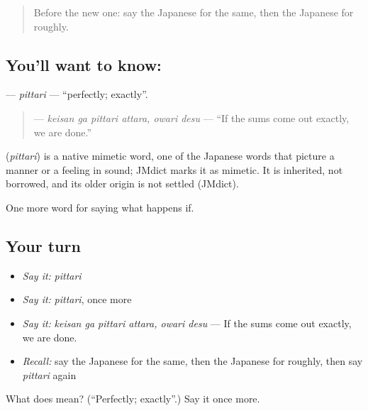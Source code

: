 \label{lesson:JA-C370-pittari}



\begin{quote}
Before the new one: say the Japanese for the same, then the Japanese for roughly.
\end{quote}

\subsection*{You'll want to know: }
\textbf{} — \emph{pittari} — \textquotedblleft{}perfectly; exactly\textquotedblright{}.

\begin{quote}
\textbf{  } — \emph{keisan ga pittari attara, owari desu} — \textquotedblleft{}If the sums come out exactly, we are done.\textquotedblright{}
\end{quote}

\begin{cousinweb}
\textbf{} (\emph{pittari}) is a native mimetic word, one of the Japanese words that picture a manner or a feeling in sound; JMdict marks it as mimetic. It is inherited, not borrowed, and its older origin is not settled (JMdict).
\end{cousinweb}

\begin{grammarlens}[title={What you've built}]
One more word for saying what happens if.
\end{grammarlens}

\subsection*{Your turn}
\begin{itemize}
\raggedright
  \item \emph{Say it:} \emph{pittari}
  \item \emph{Say it:} \emph{pittari}, once more
  \item \emph{Say it:} \emph{keisan ga pittari attara, owari desu} — If the sums come out exactly, we are done.
  \item \emph{Recall:} say the Japanese for the same, then the Japanese for roughly, then say \emph{pittari} again
\end{itemize}

\begin{tcolorbox}[breakable,colback=teal!4,colframe=teal!35!black,title={Before you move on}]
What does  mean? (\textquotedblleft{}Perfectly; exactly\textquotedblright{}.) Say it once more.
\end{tcolorbox}
